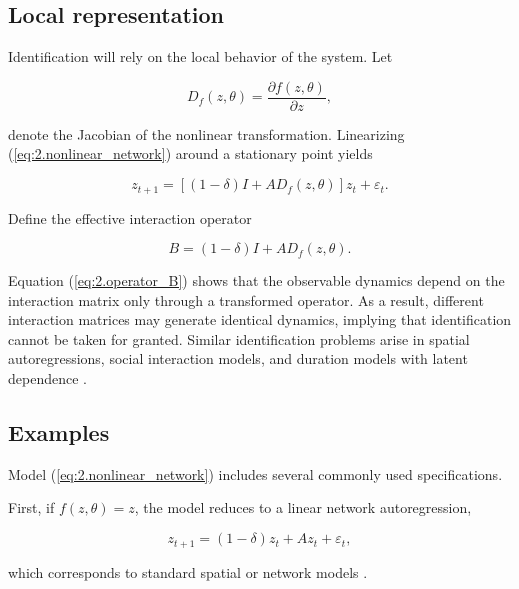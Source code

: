 \documentclass[12pt]{article}
\numberwithin{equation}{section}
\begin{document}
\subsection{Local representation}

Identification will rely on the local behavior of the system. Let

\begin{equation}
D_f(z,\theta)
=
\frac{\partial f(z,\theta)}{\partial z},
\label{eq:2.jacobian}
\end{equation}

denote the Jacobian of the nonlinear transformation. Linearizing
(\ref{eq:2.nonlinear_network}) around a stationary point yields

\begin{equation}
z_{t+1}
=
\left[
(1-\delta) I
+
A D_f(z,\theta)
\right] z_t
+
\varepsilon_t.
\label{eq:2.linearization}
\end{equation}

Define the effective interaction operator

\begin{equation}
B
=
(1-\delta) I
+
A D_f(z,\theta).
\label{eq:2.operator_B}
\end{equation}

Equation (\ref{eq:2.operator_B}) shows that the observable dynamics depend on
the interaction matrix only through a transformed operator. As a result,
different interaction matrices may generate identical dynamics, implying that
identification cannot be taken for granted. Similar identification problems
arise in spatial autoregressions, social interaction models, and duration
models with latent dependence \citep{manski1993identification,
graham2017econometrics, abbring2007heterogeneity}.

\subsection{Examples}

Model (\ref{eq:2.nonlinear_network}) includes several commonly used
specifications.

First, if $f(z,\theta)=z$, the model reduces to a linear network
autoregression,

\begin{equation}
z_{t+1}
=
(1-\delta) z_t
+
A z_t
+
\varepsilon_t,
\label{eq:2.linear_network}
\end{equation}

which corresponds to standard spatial or network models
\citep{anselin1988spatial, depaula2017econometrics}.
\end{document}

